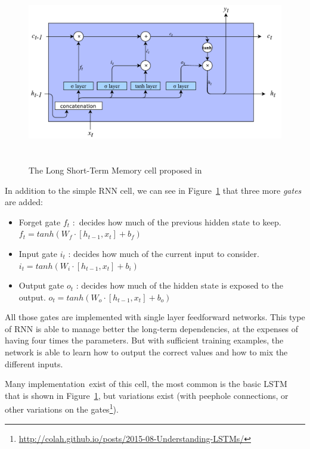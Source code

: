 \begin{figure}[!htbp]
    \centering
    \includegraphics[max width=\linewidth,max height=8cm,keepaspectratio]{figures/LSTM}
    \caption{The Long Short-Term Memory cell proposed in~\cite{hochreiter1997long}}\label{fig:LSTM}
\end{figure}

In addition to the simple RNN cell, we can see in Figure~\ref{fig:LSTM} that three more \textit{gates} are added:

\begin{itemize}
	\item Forget gate  \( f_{t} \) :\ decides how much of the previous hidden state to keep.   \( f_{t}=tanh \left( W_{f}\cdot  \left[ h_{t-1}, x_{t} \right]  + b_{f} \right)  \) 

	\item Input gate  \( i_{t} \) : decides how much of the current input to consider.  \( i_{t}=tanh \left( W_{i}\cdot  \left[ h_{t-1}, x_{t} \right]  + b_{i} \right)  \) 

	\item Output gate  \( o_{t} \) : decides how much of the hidden state is exposed to the output.  \( o_{t}=tanh \left( W_{o}\cdot  \left[ h_{t-1}, x_{t} \right]  + b_{o} \right)  \) 
\end{itemize}

All those gates are implemented with single layer feedforward networks. This type of RNN is able to manage better the long-term dependencies, at the expenses of having four times the parameters. But with sufficient training examples, the network is able to learn how to output the correct values and how to mix the different inputs.

Many implementation\ exist of this cell, the most common is the basic LSTM that is shown in  Figure~\ref{fig:LSTM}, but variations exist (with peephole connections, or other variations on the gates\footnote{\url{http://colah.github.io/posts/2015-08-Understanding-LSTMs/}}).

